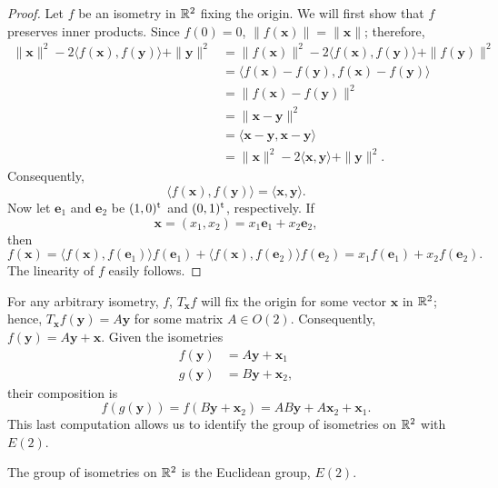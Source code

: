  
\begin{proof}
Let $f$ be an isometry in ${\Bbb R}^2$ fixing the origin. We will
first show that $f$ preserves inner products. Since $f(0) = 0$, $\|
f({\mathbf x})\| = \| {\mathbf x} \|$; therefore,
\begin{align*}
\| {\mathbf x} \|^2 - 2 \langle f({\mathbf x}), f({\mathbf y}) \rangle + \|
{\mathbf y} \|^2 
& =
\| f({\mathbf x}) \|^2 - 2 \langle f({\mathbf x}), f({\mathbf y}) \rangle +
\| f({\mathbf y}) \|^2 \\ 
& =
\langle
f({\mathbf x}) -  f({\mathbf y}), f({\mathbf x}) -  f({\mathbf y})
\rangle \\
& =
\| f({\mathbf x}) -  f({\mathbf y}) \|^2 \\
& =
\| {\mathbf x} -  {\mathbf y} \|^2 \\
& =
\langle
{\mathbf x} -  {\mathbf y}, {\mathbf x} -  {\mathbf y} \rangle \\
& =
\| {\mathbf x} \|^2 - 2 \langle {\mathbf x}, {\mathbf y} \rangle + \| {\mathbf
y} \|^2. 
\end{align*}
Consequently,
\[
\langle f({\mathbf x}), f({\mathbf y}) \rangle
=
\langle {\mathbf x}, {\mathbf y} \rangle.
\]
Now let ${\mathbf e}_1$ and ${\mathbf e_2}$ be $(1, 0)^{\rm t}$ and $(0,
1)^{\rm t}$, respectively. If 
\[
{\mathbf x} = (x_1, x_2) = x_1 {\mathbf e}_1 + x_2 {\mathbf e}_2,
\]
then
\[
f({\mathbf x})
=
\langle
f({\mathbf x}), f({\mathbf e}_1)
\rangle
f({\mathbf e}_1)
+\langle
f({\mathbf x}), f({\mathbf e}_2)
\rangle
f({\mathbf e}_2)
=
x_1 f({\mathbf e}_1)+x_2 f({\mathbf e}_2).
\]
The linearity of $f$ easily follows.
\end{proof}
 
 
\medskip
 
 
For any arbitrary isometry, $f$,  $T_{\mathbf x} f$ will fix the origin
for some vector ${\mathbf x}$ in ${\Bbb R}^2$; hence, $T_{\mathbf x}
f({\mathbf y}) = A {\mathbf y}$ for some matrix $A \in O(2)$.
Consequently, $f({\mathbf y}) = A {\mathbf y} + {\mathbf x}$.  Given the
isometries 
\begin{align*}
f({\mathbf y}) & = A {\mathbf y} + {\mathbf x}_1 \\
g({\mathbf y}) & = B {\mathbf y} + {\mathbf x}_2,
\end{align*}
their composition is
\[
f(g({\mathbf y})) =
f(B {\mathbf y} + {\mathbf x}_2) =
AB {\mathbf y} + A{\mathbf x}_2 + {\mathbf x}_1.
\]
This last computation allows us to identify the group of isometries on
${\Bbb R}^2$ with~$E(2)$. 
 
 
\begin{theorem}
The group of isometries on ${\Bbb R}^2$ is the Euclidean group,
$E(2)$. 
\end{theorem}
 
